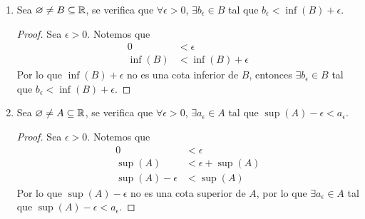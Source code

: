 \begin{enumerate}[label=\alph*)]
  \begin{proof}\leavevmode
    \begin{enumerate}[label=\roman*)]
      \item Sea $x\in A$. Se tiene que $x\in B$, y por definición, $\inf (B) \leq x$, por lo que $\inf (B)$ es cota inferior de $A$. Por definición, el ínfimo de $A$ es mayor o igual que todas sus cotas inferiores, es decir, $\inf (B) \leq \inf (A)$.
      \item Sea $x\in A$. Por definición, $\inf (A) \leq x \leq \sup (A)$, por lo que $\inf (A) \leq \sup (A)$. (El ínfimo es menor o igual que el supremo).
      \item Sea $x\in A$. Se tiene que $x\in B$, y por definición, $x\leq \sup (B)$, por lo que $\sup (B)$ es cota superior de $A$, y por definición, el supremo de $A$ es menor o igual que todas sus cotas superiores, es decir, $\sup (A) \leq \sup (B)$. \qedhere
    \end{enumerate}
  \end{proof}
  
  \begin{enumerate}[label=\roman*)]
  \item $\inf (B) \leq \sup (A)$.
  \item $\inf (A) \leq \sup (B)$.
  \end{enumerate}
  \item Sea $\varnothing \neq B\subseteq \mathbb{R}$, se verifica que $\forall \epsilon > 0$, $\exists b_\epsilon\in B$ tal que $b_\epsilon < \inf (B) + \epsilon$.
  
  \begin{proof}\leavevmode
    Sea $\epsilon >0$. Notemos que
    \begin{align*}
      0 &< \epsilon\\
      \inf (B) &< \inf (B) + \epsilon
    \end{align*}
    Por lo que $\inf (B) +\epsilon$ no es una cota inferior de $B$, entonces $\exists b_\epsilon\in B$ tal que $b_\epsilon < \inf (B) + \epsilon$.
  \end{proof}
  
  \item Sea $\varnothing \neq A\subseteq \mathbb{R}$, se verifica que $\forall \epsilon > 0$, $\exists a_\epsilon\in A$ tal que $\sup (A) - \epsilon < a_\epsilon$.
  \begin{proof}\leavevmode
    Sea $\epsilon>0$. Notemos que 
    \begin{align*}
      0 &< \epsilon\\
      \sup (A) &< \epsilon + \sup (A)\\
      \sup (A) - \epsilon &< \sup (A)
    \end{align*}
    Por lo que $\sup (A)-\epsilon$ no es una cota superior de $A$, por lo que $\exists a_\epsilon\in A$ tal que $\sup (A) - \epsilon < a_\epsilon$.
  \end{proof}
  

\end{enumerate}
